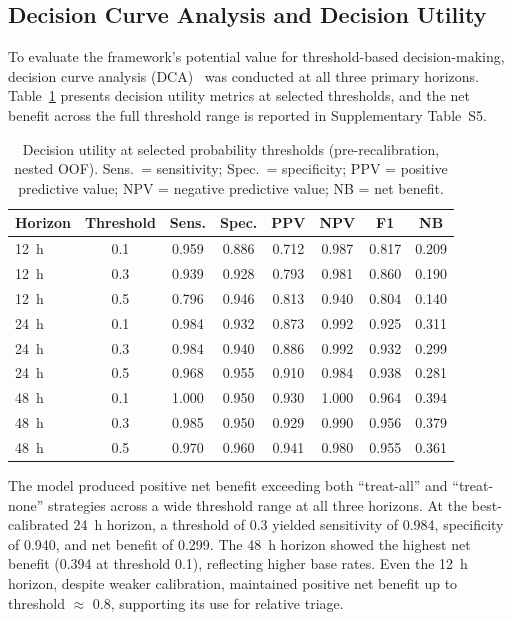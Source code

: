\documentclass[fire,article,submit,pdftex]{../Definitions/mdpi}
\begin{document}
\subsection{Decision Curve Analysis and Decision Utility}\label{sec:dca_results}

To evaluate the framework's potential value for threshold-based decision-making, decision curve analysis (DCA)~\cite{Vickers2006} was conducted at all three primary horizons.
Table~\ref{tab:dca_utility} presents decision utility metrics at selected thresholds, and the net benefit across the full threshold range is reported in Supplementary Table~S5.

\begin{table}[!ht]
\caption{Decision utility at selected probability thresholds (pre-recalibration, nested OOF). Sens.\ = sensitivity; Spec.\ = specificity; PPV = positive predictive value; NPV = negative predictive value; NB = net benefit.}\label{tab:dca_utility}
\small
\begin{tabular}{lccccccc}
\toprule
\textbf{Horizon} & \textbf{Threshold} & \textbf{Sens.} & \textbf{Spec.} & \textbf{PPV} & \textbf{NPV} & \textbf{F1} & \textbf{NB} \\
\midrule
12~h & 0.1 & 0.959 & 0.886 & 0.712 & 0.987 & 0.817 & 0.209 \\
12~h & 0.3 & 0.939 & 0.928 & 0.793 & 0.981 & 0.860 & 0.190 \\
12~h & 0.5 & 0.796 & 0.946 & 0.813 & 0.940 & 0.804 & 0.140 \\
\midrule
24~h & 0.1 & 0.984 & 0.932 & 0.873 & 0.992 & 0.925 & 0.311 \\
24~h & 0.3 & 0.984 & 0.940 & 0.886 & 0.992 & 0.932 & 0.299 \\
24~h & 0.5 & 0.968 & 0.955 & 0.910 & 0.984 & 0.938 & 0.281 \\
\midrule
48~h & 0.1 & 1.000 & 0.950 & 0.930 & 1.000 & 0.964 & 0.394 \\
48~h & 0.3 & 0.985 & 0.950 & 0.929 & 0.990 & 0.956 & 0.379 \\
48~h & 0.5 & 0.970 & 0.960 & 0.941 & 0.980 & 0.955 & 0.361 \\
\bottomrule
\end{tabular}
\end{table}

The model produced positive net benefit exceeding both ``treat-all'' and ``treat-none'' strategies across a wide threshold range at all three horizons.
At the best-calibrated 24~h horizon, a threshold of 0.3 yielded sensitivity of 0.984, specificity of 0.940, and net benefit of 0.299.
The 48~h horizon showed the highest net benefit (0.394 at threshold 0.1), reflecting higher base rates.
Even the 12~h horizon, despite weaker calibration, maintained positive net benefit up to threshold $\approx$ 0.8, supporting its use for relative triage.
\end{document}
